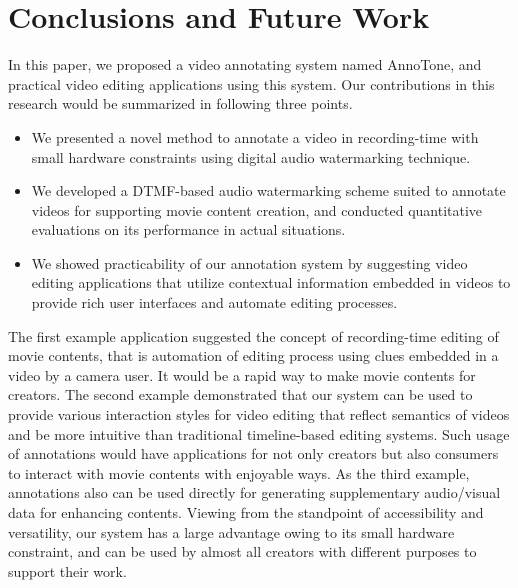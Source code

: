 \chapter{Conclusions and Future Work}

In this paper, we proposed a video annotating system named AnnoTone, and practical video editing applications using this system.
Our contributions in this research would be summarized in following three points.
\begin{itemize}
\item We presented a novel method to annotate a video in recording-time with small hardware constraints using digital audio watermarking technique.
\item We developed a DTMF-based audio watermarking scheme suited to annotate videos for supporting movie content creation, and conducted quantitative evaluations on its performance in actual situations.
\item We showed practicability of our annotation system by suggesting video editing applications that utilize contextual information embedded in videos to provide rich user interfaces and automate editing processes.
\end{itemize}
The first example application suggested the concept of recording-time editing of movie contents, that is automation of editing process using clues embedded in a video by a camera user.
It would be a rapid way to make movie contents for creators.
The second example demonstrated that our system can be used to provide various interaction styles for video editing that reflect semantics of videos and be more intuitive than traditional timeline-based editing systems.
Such usage of annotations would have applications for not only creators but also consumers to interact with movie contents with enjoyable ways.
As the third example, annotations also can be used directly for generating supplementary audio/visual data for enhancing contents.
Viewing from the standpoint of accessibility and versatility, our system has a large advantage owing to its small hardware constraint, and can be used by almost all creators with different purposes to support their work.

